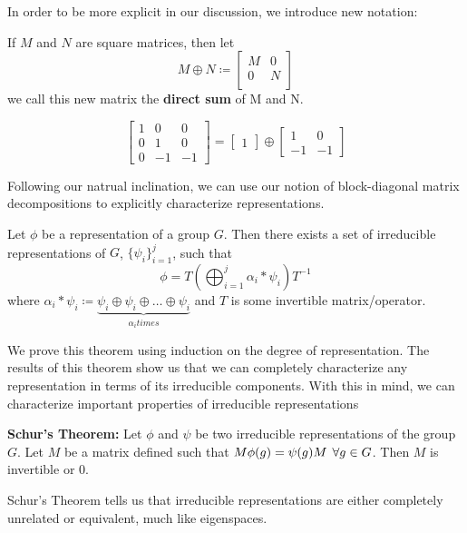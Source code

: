 \documentclass[compress,aspectratio=169,10pt,usenames,dvipsnames]{beamer}
\begin{document}
%
%
\begin{frame}
\vfill
In order to be more explicit in our discussion, we introduce new notation:
\vfill
\begin{definition}
	If $M$ and $N$ are square matrices, then let $$M\oplus N \coloneq \begin{bmatrix}
																			M & 0\\
																			0 & N\\
																		\end{bmatrix}$$
	we call this new matrix the \textbf{direct sum} of M and N.
\end{definition}
\vfill
\begin{example}
$$\begin{bmatrix}
	1 & 0 & 0 \\
	0 & 1 & 0 \\
	0 & -1 & -1
\end{bmatrix} = \begin{bmatrix}
					1
					\end{bmatrix} \oplus
					\begin{bmatrix}
						1 & 0 \\
						-1 & -1
					\end{bmatrix}$$
\end{example}
\vfill
\end{frame}
%
%
\begin{frame}
\vfill
Following our natrual inclination, we can use our notion of block-diagonal matrix decompositions to explicitly characterize representations.
\vfill
\begin{theorem}
	Let $\phi$ be a representation of a group $G$.  Then there exists a set of irreducible representations of $G$, $\{\psi_i\}_{i=1}^j$, such that $$\phi = T\left(\bigoplus_{i=1}^j \alpha_i*\psi_i\right)T^{-1}$$ where $\alpha_i*\psi_i \coloneq \underbrace{\psi_i \oplus \psi_i \oplus \hdots \oplus \psi_i}_{\alpha_i times}$ and $T$ is some invertible matrix/operator. 
\end{theorem}
\vfill
We prove this theorem using induction on the degree of representation.
\vfill 
The results of this theorem show us that we can completely characterize any representation in terms of its irreducible components. With this in mind, we can characterize important properties of irreducible representations
\vfill
\end{frame}
%
%
\begin{frame}
\vfill

\begin{theorem} \textbf{Schur's Theorem:}
	Let $\phi$ and $\psi$ be two irreducible representations of the group $G$. Let $M$ be a matrix defined such that $M\phi(g) = \psi(g)M \hspace{1.5mm}\forall g \in G$. Then $M$ is invertible or $0$. 
\end{theorem}
\vfill
Schur's Theorem tells us that irreducible representations are either completely unrelated or equivalent, much like eigenspaces.
\vfill
\end{frame}
\end{document}

